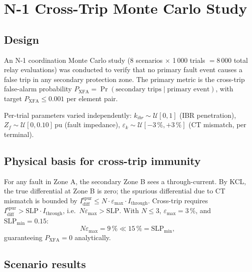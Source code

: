 \documentclass[12pt,a4paper]{article}
\begin{document}
\section{N-1 Cross-Trip Monte Carlo Study}
\label{sec:n1mc}

\subsection{Design}

An N-1 coordination Monte Carlo study (8 scenarios $\times$ 1\,000 trials
$= 8\,000$ total relay evaluations) was conducted to verify that no primary
fault event causes a false trip in any secondary protection zone.  The primary
metric is the cross-trip false-alarm probability
$P_\mathrm{XFA} = \Pr(\text{secondary trips} \mid \text{primary event})$,
with target $P_\mathrm{XFA} \leq 0.001$ per element pair.

Per-trial parameters varied independently:
$k_{ibr} \sim \mathcal{U}[0, 1]$ (IBR penetration),
$Z_f \sim \mathcal{U}[0, 0.10]$\,pu (fault impedance),
$\varepsilon_k \sim \mathcal{U}[-3\,\%, +3\,\%]$ (CT mismatch, per terminal).

\subsection{Physical basis for cross-trip immunity}

For any fault in Zone A, the secondary Zone B sees a through-current.
By KCL, the true differential at Zone B is zero; the spurious differential
due to CT mismatch is bounded by
$I_\mathrm{diff}^\mathrm{spur} \leq N \cdot \varepsilon_\mathrm{max}
\cdot I_\mathrm{through}$.
Cross-trip requires $I_\mathrm{diff}^\mathrm{spur} > \mathrm{SLP}
\cdot I_\mathrm{through}$, i.e.\ $N\varepsilon_\mathrm{max} > \mathrm{SLP}$.
With $N \leq 3$, $\varepsilon_\mathrm{max} = 3\,\%$, and
$\mathrm{SLP}_\mathrm{min} = 0.15$:
\[
  N\varepsilon_\mathrm{max} = 9\,\% \ll 15\,\% = \mathrm{SLP}_\mathrm{min},
\]
guaranteeing $P_\mathrm{XFA} = 0$ analytically.

\subsection{Scenario results}
\end{document}
